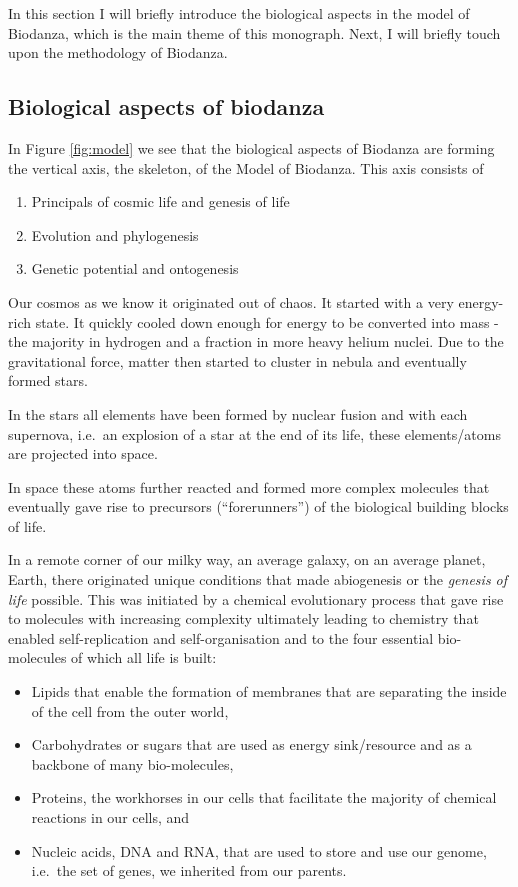 \documentclass[
  11pt,
]{book}
\providecommand{\tightlist}{%
  \setlength{\itemsep}{0pt}\setlength{\parskip}{0pt}}
\begin{document}
In this section I will briefly introduce the biological aspects in the model of Biodanza, which is the main theme of this monograph. Next, I will briefly touch upon the methodology of Biodanza.

\hypertarget{biological-aspects-of-biodanza}{%
\subsection{Biological aspects of biodanza}\label{biological-aspects-of-biodanza}}

In Figure \ref{fig:model} we see that the biological aspects of Biodanza are forming the vertical axis, the skeleton, of the Model of Biodanza. This axis consists of

\begin{enumerate}
\def\labelenumi{\arabic{enumi}.}
\tightlist
\item
  Principals of cosmic life and genesis of life
\item
  Evolution and phylogenesis
\item
  Genetic potential and ontogenesis
\end{enumerate}

Our cosmos as we know it originated out of chaos. It started with a very energy-rich state. It quickly cooled down enough for energy to be converted into mass - the majority in hydrogen and a fraction in more heavy helium nuclei. Due to the gravitational force, matter then started to cluster in nebula and eventually formed stars.

In the stars all elements have been formed by nuclear fusion and with each supernova, i.e.~an explosion of a star at the end of its life, these elements/atoms are projected into space.

In space these atoms further reacted and formed more complex molecules that eventually gave rise to precursors (``forerunners'') of the biological building blocks of life.

In a remote corner of our milky way, an average galaxy, on an average planet, Earth, there originated unique conditions that made abiogenesis or the \emph{genesis of life} possible.
This was initiated by a chemical evolutionary process that gave rise to molecules with increasing complexity ultimately leading to chemistry that enabled self-replication and self-organisation and to the four essential bio-molecules of which all life is built:

\begin{itemize}
\tightlist
\item
  Lipids that enable the formation of membranes that are separating the inside of the cell from the outer world,
\item
  Carbohydrates or sugars that are used as energy sink/resource and as a backbone of many bio-molecules,
\item
  Proteins, the workhorses in our cells that facilitate the majority of chemical reactions in our cells, and
\item
  Nucleic acids, DNA and RNA, that are used to store and use our genome, i.e.~the set of genes, we inherited from our parents.
\end{itemize}
\end{document}
